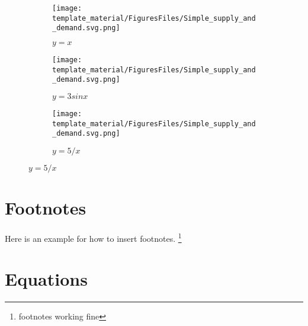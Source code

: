\documentclass[Theme1]{{template_material/eurostat}}
\begin{document}
\begin{figure}[h]
    \caption{Three simple graphs}
    \label{fig:three graphs}
     \centering
     \begin{subfigure}[b]{0.3\textwidth}
         \centering
         \texttt{[image: template\_material/FiguresFiles/Simple\_supply\_and\_demand.svg.png]}
         \caption{$y=x$}
         \label{fig:y equals x}
     \end{subfigure}
     \hfill
     \begin{subfigure}[b]{0.3\textwidth}
         \centering
         \texttt{[image: template\_material/FiguresFiles/Simple\_supply\_and\_demand.svg.png]}
         \caption{$y=3sinx$}
         \label{fig:three sin x}
     \end{subfigure}
     \hfill
     \begin{subfigure}[b]{0.3\textwidth}
         \centering
         \texttt{[image: template\_material/FiguresFiles/Simple\_supply\_and\_demand.svg.png]}
         \caption{$y=5/x$}
         \label{fig:five over x}
     \end{subfigure}
\end{figure}








\newpage %
\section{Footnotes}

Here is an example for how to insert footnotes. \footnote{footnotes working fine}

\newpage %

\section{Equations}
\end{document}
